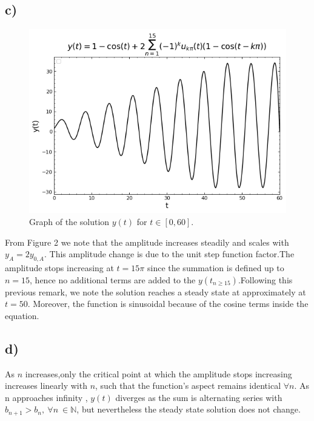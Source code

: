 \documentclass[
	12pt,
	]{article}
\theoremstyle{definition}
\theoremstyle{definition}
\theoremstyle{definition}
\theoremstyle{definition}
\theoremstyle{definition}
\theoremstyle{example}
\theoremstyle{note}
\theoremstyle{remark}
\theoremstyle{example}
\begin{document}
			\subsection*{c) }
				\vspace{-1.75cm}
				\begin{figure}[H]
					\centering 
					\includegraphics[width=0.8\linewidth]{MATH325_Ass4_Fig2.png}
					\captionsetup{margin=1.5cm , justification=raggedright} \caption{Graph of the solution $y(t)$ for $t \in [0,60]$.}
				\end{figure}
				From Figure 2 we note that the amplitude increases steadily and scales with $y_A = 2y _{0,A}$. This amplitude change is due to the unit step function factor.The amplitude stops increasing at $t = 15\pi$ since the summation is defined up to $n=15$, hence no additional terms are added to the $y(t_{n\ge 15}).$Following this previous remark, we note the solution reaches a steady state at approximately at $t=50$.  Moreover, the function is sinusoidal because of the cosine terms inside the equation. 
			\subsection*{d) }
				As $n$ increases,only the critical point at which the amplitude stops increasing increases linearly with $n$, such that the function's aspect remains identical $\forall n$. As n approaches infinity , $y(t)$ diverges as the sum is alternating series with $b_{n+1} > b_{n} , \ \forall n \ \in \mathbb{N}$, but nevertheless the steady state solution does not change. 
\end{document}
